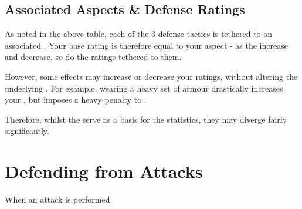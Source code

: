 \subsection{Associated Aspects \& Defense Ratings}

As noted in the above table, each of the 3 defense tactics is tethered to an associated . Your base  rating is therefore equal to your  aspect - as the  increase and decrease, so do the  ratings tethered to them. 

However, some effects may increase or decrease your  ratings, without altering the underlying . For example, wearing a heavy set of armour drastically increases your , but imposes a heavy penalty to . 

Therefore, whilst the  serve as a basis for the  statistics, they may diverge fairly significantly. 

\section{Defending from Attacks}

When an attack is performed
